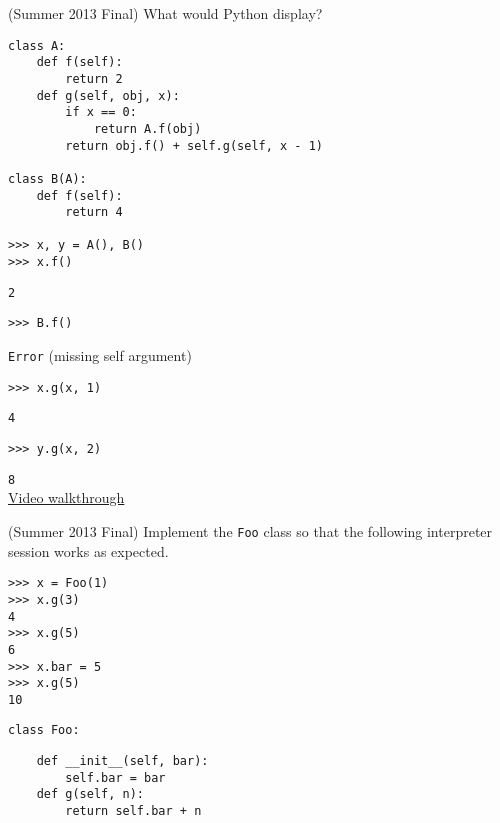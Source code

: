 \question (Summer 2013 Final) What would Python display?

\begin{lstlisting}
class A:
    def f(self):
        return 2
    def g(self, obj, x):
        if x == 0:
            return A.f(obj)
        return obj.f() + self.g(self, x - 1)

class B(A):
    def f(self):
        return 4

>>> x, y = A(), B()
>>> x.f()
\end{lstlisting}
\begin{solution}[0.25in]
\lstinline{2}
\end{solution}

\begin{lstlisting}
>>> B.f()
\end{lstlisting}
\begin{solution}[0.25in]
\lstinline{Error} (missing self argument)
\end{solution}

\begin{lstlisting}
>>> x.g(x, 1)
\end{lstlisting}
\begin{solution}[0.25in]
\lstinline{4}
\end{solution}

\begin{lstlisting}
>>> y.g(x, 2)
\end{lstlisting}
\begin{solution}[0.25in]
\lstinline{8}\\
\href{https://www.youtube.com/watch?v=BatqjYa7WZ8&list=PLx38hZJ5RLZfel-Gi9pjaUbfQDCZIsWMU&vq=hd1080&t=48m20s}{Video walkthrough}
\end{solution}

\question (Summer 2013 Final) Implement the \texttt{Foo} class so that the
following interpreter session works as expected.

\begin{lstlisting}
>>> x = Foo(1)
>>> x.g(3)
4
>>> x.g(5)
6
>>> x.bar = 5
>>> x.g(5)
10
\end{lstlisting}

\begin{lstlisting}
class Foo:
\end{lstlisting}
\begin{solution}[0.5in]
\begin{lstlisting}
    def __init__(self, bar):
        self.bar = bar
    def g(self, n):
        return self.bar + n
\end{lstlisting}
\end{solution}
